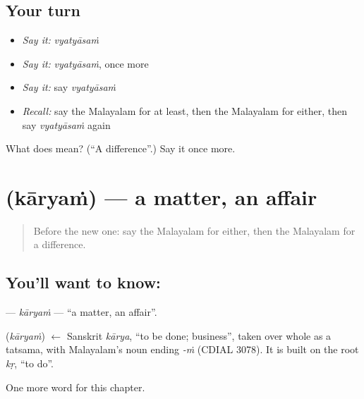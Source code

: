 \subsection*{Your turn}
\begin{itemize}
\raggedright
  \item \emph{Say it:} \emph{vyatyāsaṁ}
  \item \emph{Say it:} \emph{vyatyāsaṁ}, once more
  \item \emph{Say it:} say \emph{vyatyāsaṁ}
  \item \emph{Recall:} say the Malayalam for at least, then the Malayalam for either, then say \emph{vyatyāsaṁ} again
\end{itemize}

\begin{tcolorbox}[breakable,colback=teal!4,colframe=teal!35!black,title={Before you move on}]
What does  mean? (\textquotedblleft{}A difference\textquotedblright{}.) Say it once more.
\end{tcolorbox}
\section[\texorpdfstring{\ml{കാര്യം} (kāryaṁ)}{കാര്യം (kāryaṁ)}]{ (kāryaṁ) — a matter, an affair}

\label{lesson:ML-C242-karyam}



\begin{quote}
Before the new one: say the Malayalam for either, then the Malayalam for a difference.
\end{quote}

\subsection*{You'll want to know: }
\textbf{} — \emph{kāryaṁ} — \textquotedblleft{}a matter, an affair\textquotedblright{}.

\begin{cousinweb}
\textbf{} (\emph{kāryaṁ}) $\leftarrow$ Sanskrit \emph{kārya}, \textquotedblleft{}to be done; business\textquotedblright{}, taken over whole as a tatsama, with Malayalam's noun ending \emph{-ṁ} (CDIAL 3078). It is built on the root \emph{kṛ}, \textquotedblleft{}to do\textquotedblright{}.
\end{cousinweb}

\begin{grammarlens}[title={What you've built}]
One more word for this chapter.
\end{grammarlens}

